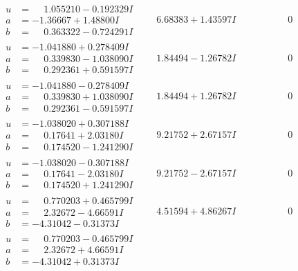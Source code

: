 \documentclass[1p]{elsarticle_modified}
\theoremstyle{definition}
\begin{document}
$$\begin{array}{c|c|c}
\begin{aligned}
u &= \phantom{-}1.055210 - 0.192329 I \\
a &= -1.36667 + 1.48800 I \\
b &= \phantom{-}0.363322 - 0.724291 I\end{aligned}
 & \phantom{-}6.68383 + 1.43597 I & \phantom{-0.000000 } 0 \\ \hline\begin{aligned}
u &= -1.041880 + 0.278409 I \\
a &= \phantom{-}0.339830 - 1.038090 I \\
b &= \phantom{-}0.292361 + 0.591597 I\end{aligned}
 & \phantom{-}1.84494 - 1.26782 I & \phantom{-0.000000 } 0 \\ \hline\begin{aligned}
u &= -1.041880 - 0.278409 I \\
a &= \phantom{-}0.339830 + 1.038090 I \\
b &= \phantom{-}0.292361 - 0.591597 I\end{aligned}
 & \phantom{-}1.84494 + 1.26782 I & \phantom{-0.000000 } 0 \\ \hline\begin{aligned}
u &= -1.038020 + 0.307188 I \\
a &= \phantom{-}0.17641 + 2.03180 I \\
b &= \phantom{-}0.174520 - 1.241290 I\end{aligned}
 & \phantom{-}9.21752 + 2.67157 I & \phantom{-0.000000 } 0 \\ \hline\begin{aligned}
u &= -1.038020 - 0.307188 I \\
a &= \phantom{-}0.17641 - 2.03180 I \\
b &= \phantom{-}0.174520 + 1.241290 I\end{aligned}
 & \phantom{-}9.21752 - 2.67157 I & \phantom{-0.000000 } 0 \\ \hline\begin{aligned}
u &= \phantom{-}0.770203 + 0.465799 I \\
a &= \phantom{-}2.32672 - 4.66591 I \\
b &= -4.31042 - 0.31373 I\end{aligned}
 & \phantom{-}4.51594 + 4.86267 I & \phantom{-0.000000 } 0 \\ \hline\begin{aligned}
u &= \phantom{-}0.770203 - 0.465799 I \\
a &= \phantom{-}2.32672 + 4.66591 I \\
b &= -4.31042 + 0.31373 I\end{aligned}

\end{array}$$
\end{document}

